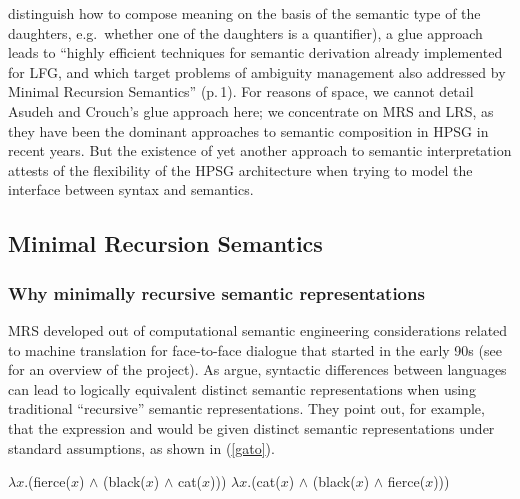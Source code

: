 \documentclass[output=paper
	        ,collection
	        ,collectionchapter
 	        ,biblatex
                ,babelshorthands
                ,newtxmath
                ,draftmode
                ,colorlinks, citecolor=brown
]{langscibook}
\begin{document}
 distinguish how to compose meaning on the basis of the semantic type of the daughters, e.g.\ whether one of the daughters is a quantifier), a glue approach leads to ``highly efficient techniques for semantic derivation already implemented for LFG, and which target problems of ambiguity management also addressed by Minimal Recursion Semantics'' (p.\,1). For reasons of space, we cannot detail Asudeh and Crouch's glue approach here; we concentrate on MRS and LRS, as they have been the dominant approaches to semantic composition in HPSG in recent years. But the existence of yet another approach to semantic interpretation attests of the flexibility of the HPSG architecture when trying to model the interface between syntax and semantics.


\subsection{Minimal Recursion Semantics}
\label{sec-minimal-recursion-semantics}

\subsubsection{Why minimally recursive semantic representations}

MRS developed out of computational semantic engineering considerations related to machine translation for face-to-face dialogue that started in the early 90s (see \citealt{Kayetal1992} for an overview of the \verbmobil project). As \citet{Copestakeetal1995} argue, syntactic differences between languages can lead to logically equivalent distinct semantic representations when using traditional ``recursive'' semantic representations. They point out, for example, that the  expression  and   would be given distinct semantic representations under standard assumptions, as shown in (\ref{gato}).

\begin{exe}
\ex\label{gato}
\begin{xlist}
\ex\label{gatoa}
$\lambda x$.(fierce($x$) $\wedge$ (black($x$) $\wedge$ cat($x$)))
\ex\label{gatob}
$\lambda x$.(cat($x$) $\wedge$ (black($x$) $\wedge$ fierce($x$)))
\end{xlist}
\end{exe}
\end{document}
